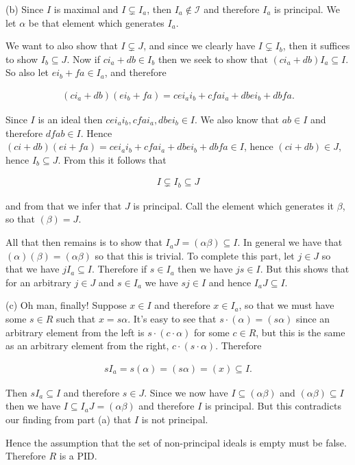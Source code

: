 \documentclass[11pt]{article}
\begin{document}
(b) Since $I$ is maximal and $I\subsetneq I_a$, then $I_a\not\in \mathscr I$ and therefore $I_a$ is principal.  We let $\alpha$ be that element which generates $I_a$.  

We want to also show that $I\subsetneq J$, and since we clearly have $I\subsetneq I_b$, then it suffices to show $I_b\subseteq J$.  Now if $ci_a+db \in I_b$ then we seek to show that $(ci_a+db)I_a\subseteq I$.  So also let $ei_b+fa\in I_a$, and therefore 

\begin{align*}
    (ci_a+db)(ei_b+fa) = cei_ai_b + cfai_a+dbei_b + dbfa.
\end{align*}

Since $I$ is an ideal then $cei_ai_b, cfai_a, dbei_b\in I$. We also know that $ab\in I$ and therefore $dfab\in I$.  Hence $(ci+db)(ei+fa)=cei_ai_b + cfai_a+dbei_b + dbfa\in I$, hence $(ci+db)\in J$, hence $I_b\subseteq J$.  From this it follows that 

\begin{align*}
    I\subsetneq I_b \subseteq J
\end{align*}

and from that we infer that $J$ is principal.  Call the element which generates it $\beta$, so that $(\beta) = J$.  

All that then remains is to show that $I_aJ = (\alpha\beta)\subseteq I$.  In general we have that $(\alpha)(\beta) = (\alpha\beta)$ so that this is trivial. To complete this part, let $j\in J$ so that we have $jI_a \subseteq I$. Therefore if $s\in I_a$ then we have $js\in I$.  But this shows that for an arbitrary $j\in J$ and $s\in I_a$ we have $sj\in I$ and hence $I_aJ\subseteq I$.  

(c) Oh man, finally!  Suppose $x\in I$ and therefore $x\in I_a$, so that we must have some $s\in R$ such that $x=s\alpha$.  It's easy to see that $s\cdot (\alpha) = (s\alpha)$ since an arbitrary element from the left is $s\cdot (c\cdot \alpha)$ for some $c\in R$, but this is the same as an arbitrary element from the right, $c\cdot (s\cdot \alpha)$.  Therefore  

\begin{align*}
    sI_a = s(\alpha) = (s\alpha)=(x)\subseteq I.
\end{align*}

Then $sI_a \subseteq I$ and therefore $s\in J$.  Since we now have $I\subseteq (\alpha\beta)$ and $(\alpha\beta)\subseteq I$ then we have $I\subseteq I_aJ=(\alpha\beta)$ and therefore $I$ is principal.  But this contradicts our finding from part (a) that $I$ is not principal.  

Hence the assumption that the set of non-principal ideals is empty must be false.  Therefore $R$ is a PID.  
\end{document}
